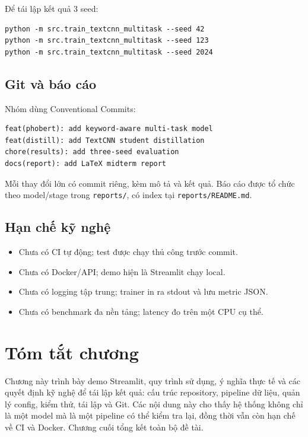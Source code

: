 \documentclass[12pt,a4paper]{report}
\begin{document}
Để tái lập kết quả 3 seed:

\begin{verbatim}
python -m src.train_textcnn_multitask --seed 42
python -m src.train_textcnn_multitask --seed 123
python -m src.train_textcnn_multitask --seed 2024
\end{verbatim}

\subsection{Git và báo cáo}

Nhóm dùng Conventional Commits:

\begin{verbatim}
feat(phobert): add keyword-aware multi-task model
feat(distill): add TextCNN student distillation
chore(results): add three-seed evaluation
docs(report): add LaTeX midterm report
\end{verbatim}

Mỗi thay đổi lớn có commit riêng, kèm mô tả và kết quả. Báo cáo được tổ chức theo model/stage trong \texttt{reports/}, có index tại \texttt{reports/README.md}.

\subsection{Hạn chế kỹ nghệ}

\begin{itemize}[leftmargin=1.2cm]
  \item Chưa có CI tự động; test được chạy thủ công trước commit.
  \item Chưa có Docker/API; demo hiện là Streamlit chạy local.
  \item Chưa có logging tập trung; trainer in ra stdout và lưu metric JSON.
  \item Chưa có benchmark đa nền tảng; latency đo trên một CPU cụ thể.
\end{itemize}


\section*{Tóm tắt chương}
Chương này trình bày demo Streamlit, quy trình sử dụng, ý nghĩa thực tế và các quyết định kỹ nghệ để tái lập kết quả: cấu trúc repository, pipeline dữ liệu, quản lý config, kiểm thử, tái lập và Git. Các nội dung này cho thấy hệ thống không chỉ là một model mà là một pipeline có thể kiểm tra lại, đồng thời vẫn còn hạn chế về CI và Docker. Chương cuối tổng kết toàn bộ đề tài.
\end{document}
